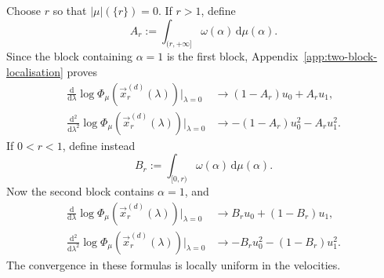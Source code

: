 \documentclass[aps,pra,11pt,onecolumn,nofootinbib,tightenlines]{revtex4-2}
\theoremstyle{definition}
\begin{document}
Choose $r$ so that $|\mu|(\{r\})=0$. If $r>1$, define
\begin{equation}
 A_r:=\int_{(r,+\infty]}\omega(\alpha)\,\mathrm d\mu(\alpha).
 \label{eq:def-A-r}
\end{equation}
Since the block containing $\alpha=1$ is the first block, Appendix~\ref{app:two-block-localisation} proves
\begin{align}
 \frac{\mathrm d}{\mathrm d\lambda}
 \log\Phi_\mu(\vec x_r^{(d)}(\lambda))\bigg|_{\lambda=0}
 &\longrightarrow
 (1-A_r)u_0+A_ru_1,
 \label{eq:two-block-log-first-r-above}\\
 \frac{\mathrm d^2}{\mathrm d\lambda^2}
 \log\Phi_\mu(\vec x_r^{(d)}(\lambda))\bigg|_{\lambda=0}
 &\longrightarrow
 -(1-A_r)u_0^2-A_ru_1^2.
 \label{eq:two-block-log-second-r-above}
\end{align}
If $0<r<1$, define instead
\begin{equation}
 B_r:=\int_{[0,r)}\omega(\alpha)\,\mathrm d\mu(\alpha).
 \label{eq:def-B-r}
\end{equation}
Now the second block contains $\alpha=1$, and
\begin{align}
 \frac{\mathrm d}{\mathrm d\lambda}
 \log\Phi_\mu(\vec x_r^{(d)}(\lambda))\bigg|_{\lambda=0}
 &\longrightarrow
 B_ru_0+(1-B_r)u_1,
 \label{eq:two-block-log-first-r-below}\\
 \frac{\mathrm d^2}{\mathrm d\lambda^2}
 \log\Phi_\mu(\vec x_r^{(d)}(\lambda))\bigg|_{\lambda=0}
 &\longrightarrow
 -B_ru_0^2-(1-B_r)u_1^2.
 \label{eq:two-block-log-second-r-below}
\end{align}
The convergence in these formulas is locally uniform in the velocities.
\end{document}
